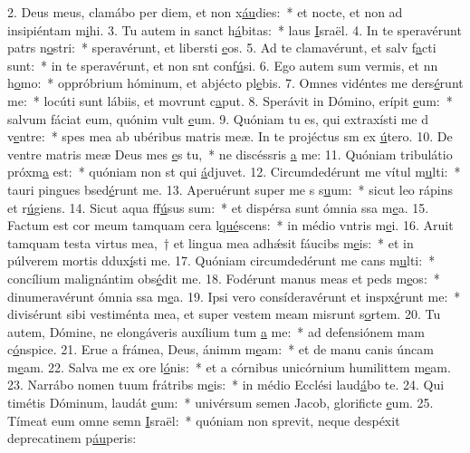 2. Deus meus, clamábo per diem, et non x\uline{áu}dies:~* et nocte, et non ad insipiéntam m\uline{i}hi.
3. Tu autem in sanct h\uline{á}bitas:~* laus \uline{I}sraël.
4. In te speravérunt patrs n\uline{o}stri:~* speravérunt, et libersti \uline{e}os.
5. Ad te clamavérunt, et salv f\uline{a}cti sunt:~* in te speravérunt, et non snt conf\uline{ú}si.
6. Ego autem sum vermis, et nn h\uline{o}mo:~* oppróbrium hóminum, et abjécto pl\uline{e}bis.
7. Omnes vidéntes me ders\uline{é}runt me:~* locúti sunt lábiis, et movrunt c\uline{a}put.
8. Sperávit in Dómino, erípit \uline{e}um:~* salvum fáciat eum, quónim vult \uline{e}um.
9. Quóniam tu es, qui extraxísti me d v\uline{e}ntre:~* spes mea ab ubéribus matris meæ. In te projéctus sm ex \uline{ú}tero.
10. De ventre matris meæ Deus mes \uline{e}s tu,~* ne discéssris \uline{a} me:
11. Quóniam tribulátio próxm\uline{a} est:~* quóniam non st qui \uline{á}djuvet.
12. Circumdedérunt me vítul m\uline{u}lti:~* tauri pingues bsed\uline{é}runt me.
13. Aperuérunt super me s s\uline{u}um:~* sicut leo rápins et r\uline{ú}giens.
14. Sicut aqua ff\uline{ú}sus sum:~* et dispérsa sunt ómnia ssa m\uline{e}a.
15. Factum est cor meum tamquam cera l\uline{qué}scens:~* in médio vntris m\uline{e}i.
16. Aruit tamquam testa virtus mea,~† et lingua mea adhǽsit fáucibs m\uline{e}is:~* et in púlverem mortis ddux\uline{í}sti me.
17. Quóniam circumdedérunt me cans m\uline{u}lti:~* concílium malignántim obs\uline{é}dit me.
18. Fodérunt manus meas et peds m\uline{e}os:~* dinumeravérunt ómnia ssa m\uline{e}a.
19. Ipsi vero consíderavérunt et inspx\uline{é}runt me:~* divisérunt sibi vestiménta mea, et super vestem meam misrunt s\uline{o}rtem.
20. Tu autem, Dómine, ne elongáveris auxílium tum \uline{a} me:~* ad defensiónem mam c\uline{ó}nspice.
21. Erue a frámea, Deus, ánimm m\uline{e}am:~* et de manu canis úncam m\uline{e}am.
22. Salva me ex ore l\uline{ó}nis:~* et a córnibus unicórnium humilittem m\uline{e}am.
23. Narrábo nomen tuum frátribs m\uline{e}is:~* in médio Ecclési laud\uline{á}bo te.
24. Qui timétis Dóminum, laudát \uline{e}um:~* univérsum semen Jacob, glorificte \uline{e}um.
25. Tímeat eum omne semn \uline{I}sraël:~* quóniam non sprevit, neque despéxit deprecatinem p\uline{áu}peris:
